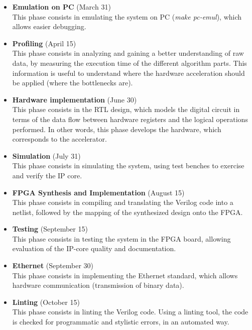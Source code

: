 \begin{itemize}
\item \textbf{Emulation on PC} (March 31)\\
This phase consists in emulating the system on PC (\textit{make pc-emul}), which allows easier debugging.

\item \textbf{Profiling} (April 15)\\
This phase consists in analyzing and gaining a better understanding of raw data, by measuring the execution time of the different algorithm parts. This information is useful to understand where the hardware acceleration should be applied (where the bottlenecks are).

\item \textbf{Hardware implementation} (June 30)\\
This phase consists in the RTL design, which models the digital circuit in terms of the data flow between hardware registers and the logical operations performed. In other words, this phase develops the hardware, which corresponds to the accelerator.

\item \textbf{Simulation} (July 31)\\
This phase consists in simulating the system, using test benches to exercise and verify the IP core.

\item \textbf{FPGA Synthesis and Implementation} (August 15)\\
This phase consists in compiling and translating the Verilog code into a netlist, followed by the mapping of the synthesized design onto the FPGA.

\item \textbf{Testing} (September 15)\\
This phase consists in testing the system in the FPGA board, allowing evaluation of the IP-core quality and documentation.

\item \textbf{Ethernet} (September 30)\\
This phase consists in implementing the Ethernet standard, which allows hardware communication (transmission of binary data).

\item \textbf{Linting} (October 15)\\
This phase consists in linting the Verilog code. Using a linting tool, the code is checked for programmatic and stylistic errors, in an automated way.

\end{itemize}

